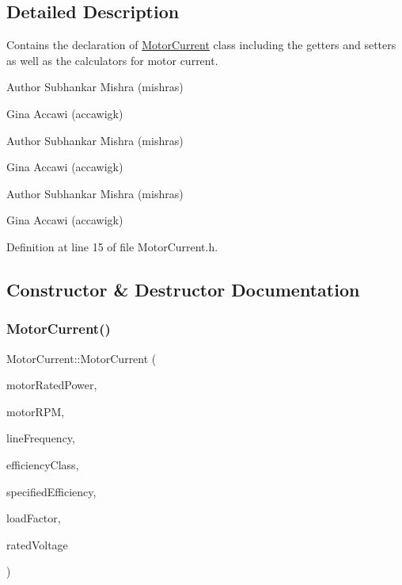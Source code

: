 \subsection{Detailed Description}
Contains the declaration of \hyperlink{class_motor_current}{Motor\+Current} class including the getters and setters as well as the calculators for motor current. 

\begin{DoxyAuthor}{Author}
Subhankar Mishra (mishras) 

Gina Accawi (accawigk) 
\end{DoxyAuthor}


\begin{DoxyAuthor}{Author}
Subhankar Mishra (mishras) 

Gina Accawi (accawigk) 
\end{DoxyAuthor}


\begin{DoxyAuthor}{Author}
Subhankar Mishra (mishras) 

Gina Accawi (accawigk) 
\end{DoxyAuthor}


Definition at line 15 of file Motor\+Current.\+h.



\subsection{Constructor \& Destructor Documentation}
\mbox{\label{class_motor_current_a9b6c25ee190196044e229b34a03d2af1}} 
\subsubsection{\texorpdfstring{Motor\+Current()}{MotorCurrent()}\hspace{0.1cm}{\footnotesize\ttfamily [1/3]}}
{\footnotesize\ttfamily Motor\+Current\+::\+Motor\+Current (\begin{DoxyParamCaption}\item[{double}]{motor\+Rated\+Power,  }\item[{double}]{motor\+R\+PM,  }\item[{Motor\+::\+Line\+Frequency}]{line\+Frequency,  }\item[{Motor\+::\+Efficiency\+Class}]{efficiency\+Class,  }\item[{double}]{specified\+Efficiency,  }\item[{double}]{load\+Factor,  }\item[{double}]{rated\+Voltage }\end{DoxyParamCaption})\hspace{0.3cm}{\ttfamily [inline]}}

